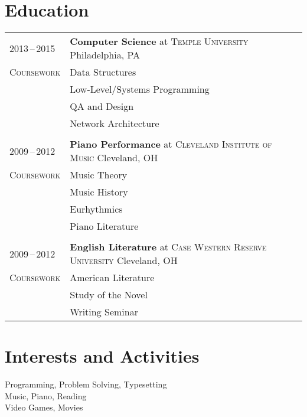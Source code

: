\documentclass[a4paper,10pt]{article}
\begin{document}
\section{Education}
\begin{tabularx}{\textwidth}{@{}p{6em}|X@{}}
    2013\,--\,2015 & \textbf{Computer Science} at \textsc{Temple University} \hfill Philadelphia, PA \\
    \textsc{Coursework} & \footnotesize{Data Structures} \\
    & \footnotesize{Low-Level/Systems Programming} \\
    & \footnotesize{QA and Design} \\
    & \footnotesize{Network Architecture} \\
    \multicolumn{2}{c}{} \\
    2009\,--\,2012 & \textbf{Piano Performance} at \textsc{Cleveland Institute of Music} \hfill Cleveland, OH \\
    \textsc{Coursework} & \footnotesize{Music Theory} \\
    & \footnotesize{Music History} \\
    & \footnotesize{Eurhythmics} \\
    & \footnotesize{Piano Literature} \\
    \multicolumn{2}{c}{} \\
    2009\,--\,2012 & \textbf{English Literature} at \textsc{Case Western Reserve University} \hfill Cleveland, OH \\
    \textsc{Coursework} & \footnotesize{American Literature} \\
    & \footnotesize{Study of the Novel} \\
    & \footnotesize{Writing Seminar}
\end{tabularx}

\section{Interests and Activities}
Programming, Problem Solving, Typesetting \\
Music, Piano, Reading \\
Video Games, Movies
\end{document}
